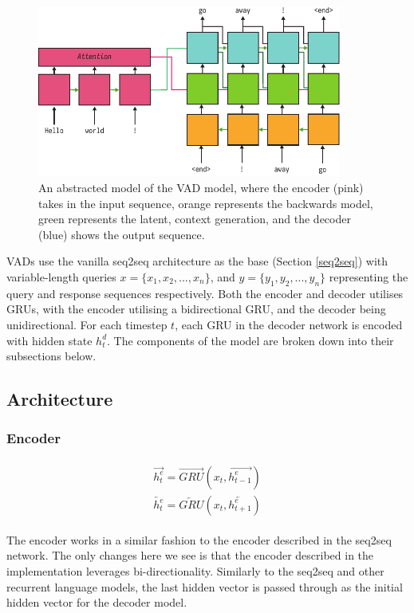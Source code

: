 \documentclass[12pt,twoside]{report}
\begin{document}
\begin{figure}[!ht]
		
	\centering
	\includegraphics[width=100mm]{diagrams/vad.pdf}
	\caption{An abstracted model of the VAD model, where the encoder (pink) takes in the input sequence, orange represents the backwards model, green represents the latent, context generation, and the decoder (blue) shows the output sequence.\label{vad_abstract}}
	\end{figure}

VADs use the vanilla seq2seq architecture as the base (Section \ref{seq2seq}) with variable-length queries $x = \{x_1, x_2, ..., x_n\}$, and $y = \{y_1, y_2, ..., y_n\}$ representing the query and response sequences respectively. Both the encoder and decoder utilises GRUs, with the encoder utilising a bidirectional GRU, and the decoder being unidirectional. For each timestep $t$, each GRU in the decoder network is encoded with hidden state $h^d_t$. The components of the model are broken down into their subsections below.

\subsection{Architecture}

\subsubsection{Encoder}

\begin{align}
\label{eqn:eqlabel}
\begin{split}
	\overrightarrow{h^e_t} = \overrightarrow{GRU}(x_t, \overrightarrow{h^e_{t-1}})
\\
\overleftarrow{h^e_t} = \overleftarrow{GRU}(x_t, \overleftarrow{h^e_{t+1}})
\end{split}
\end{align}

The encoder works in a similar fashion to the encoder described in the seq2seq network. The only changes here we see is that the encoder described in the implementation leverages bi-directionality. Similarly to the seq2seq and other recurrent language models, the last hidden vector is passed through as the initial hidden vector for the decoder model.
\end{document}
